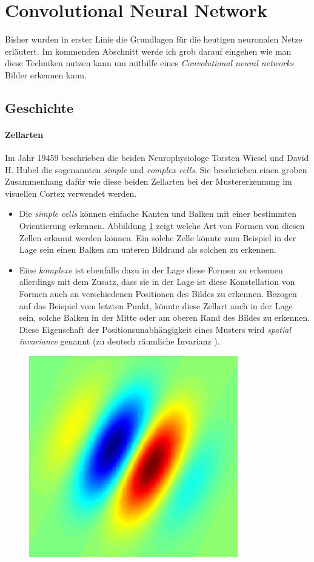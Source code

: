 \section{Convolutional Neural Network}
Bisher wurden in erster Linie die Grundlagen für die heutigen neuronalen Netze erläutert. Im kommenden Abschnitt werde ich grob darauf eingehen wie man diese Techniken nutzen kann um mithilfe eines \emph{Convolutional neural networks} Bilder erkennen kann. 


\subsection{Geschichte}

\paragraph{Zellarten} 
Im Jahr 19459 beschrieben die beiden Neurophysiologe Torsten Wiesel und David H. Hubel die sogenannten \emph{simple} und \emph{complex cells}. Sie beschrieben einen groben Zusammenhang dafür wie diese beiden Zellarten bei der Mustererkennung im visuellen Cortex verwendet werden. 

\begin{itemize}
\item Die \emph{simple cells} können einfache Kanten und Balken mit einer bestimmten Orientierung erkennen. Abbildung \ref{fig:gabor_filter} zeigt welche Art von Formen von diesen Zellen erkannt werden können. Ein solche Zelle könnte zum Beispiel in der Lage sein einen Balken am unteren Bildrand als solchen zu erkennen. 

\item Eine \emph{komplexe} ist ebenfalls dazu in der Lage diese Formen zu erkennen allerdings mit dem Zusatz, dass sie in der Lage ist diese Konstellation von Formen auch an verschiedenen Positionen des Bildes zu erkennen. Bezogen auf das Beispiel vom letzten Punkt, könnte diese Zellart auch in der Lage sein, solche Balken in der Mitte oder am oberen Rand des Bildes zu erkennen. Diese Eigenschaft der Positionsunabhängigkeit eines Musters wird \emph{spatial invariance} genannt (zu deutsch \glqq räumliche Invarianz \grqq ).
\end{itemize}

\begin{figure}[!htb]
	\centering
	\includegraphics[width=.5\linewidth]{img/gabor_filter}
	\label{fig:gabor_filter}
\end{figure}

